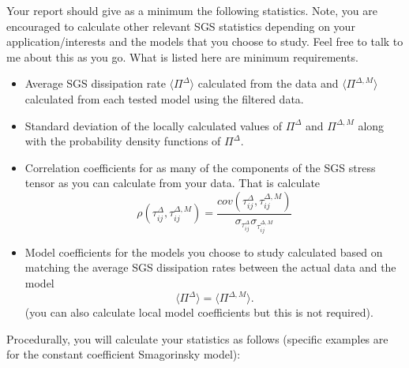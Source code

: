 \documentclass[11pt]{article}
\begin{document}
\noindent Your report should give as a minimum the following statistics.  Note, you are encouraged to calculate
other relevant SGS statistics depending on your application/interests and the models that you choose to
study.  Feel free to talk to me about this as you go.  What is listed here are minimum requirements.

\begin{itemize}

\item Average SGS dissipation rate $\langle \Pi^{\Delta}\rangle$ calculated from the data 
and $\langle \Pi^{\Delta,M} \rangle$ calculated from each tested model using the filtered data.

\item Standard deviation of the locally calculated values of $\Pi^{\Delta}$ and $\Pi^{\Delta,M}$ along
with the probability density functions of $\Pi^{\Delta}$.

\item Correlation coefficients for as many of the components of the SGS stress tensor as you
can calculate from your data.  That is calculate 
\begin{equation}
\rho\left( \tau_{ij}^{\Delta},\tau_{ij}^{\Delta,M} \right) =
\frac{cov\left( \tau_{ij}^{\Delta},\tau_{ij}^{\Delta,M} \right)}{\sigma_{\tau_{ij}^{\Delta}} 
\sigma_{\tau_{ij}^{\Delta,M}}} \nonumber
\end{equation}

\item Model coefficients for the models you choose to study calculated based on matching the average
SGS dissipation rates between the actual data and the model 
\begin{equation}
\langle \Pi^{\Delta} \rangle=\langle \Pi^{\Delta,M} \rangle. \nonumber
\end{equation}
(you can also calculate local model coefficients but this is not required).

\end{itemize}

\noindent Procedurally, you will calculate your statistics as follows (specific examples are for the constant coefficient 
Smagorinsky model):
\end{document}
